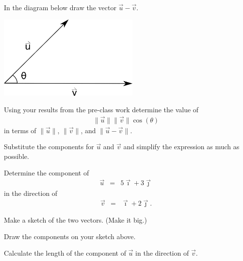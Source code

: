 \begin{problem}
\item  In the diagram below draw the vector $\vec{u}-\vec{v}$.

  \includegraphics[width=7cm]{ink/week11/dotProduct}

\item Using your results from the pre-class work determine the value
  of
  \begin{eqnarray*}
    \| \vec{u} \| \| \vec{v} \| \cos(\theta)
  \end{eqnarray*}
  in terms of $\|\vec{u}\|$, $\|\vec{v}\|$, and $\|\vec{u}-\vec{v}\|$.
  
  \vfill

\item Substitute the components for $\vec{u}$ and $\vec{v}$ and
  simplify the expression as much as possible.

  \vfill

\clearpage

\item Determine the component of 
  \begin{eqnarray*}
    \vec{u} & = & 5 \vec{\imath} + 3 \vec{\jmath}
  \end{eqnarray*}
  in the direction of 
  \begin{eqnarray*}
    \vec{v} & = & \vec{\imath} + 2 \vec{\jmath}.
  \end{eqnarray*}

  \begin{subproblem}
  \item Make a sketch of the two vectors. (Make it big.)
    \vfill
  \item Draw the components on your sketch above.
  \item Calculate the length of the component of $\vec{u}$ in the
    direction of $\vec{v}$.
    \vfill
  \end{subproblem}

\end{problem}


\postClass

